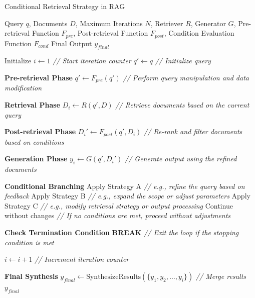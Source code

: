 \begin{algorithm}
	\caption{Conditional Retrieval Strategy in RAG}
	\label{alg:conditional_rag_workflow}
	\begin{algorithmic}[1]
		\REQUIRE Query $q$, Documents $D$, Maximum Iterations $N$, Retriever $R$, Generator $G$, Pre-retrieval Function $F_{pre}$, Post-retrieval Function $F_{post}$, Condition Evaluation Function $F_{cond}$
		\ENSURE Final Output $y_{final}$
		
		\STATE Initialize $i \gets 1$ \hfill \textit{// Start iteration counter}
		\STATE $q' \gets q$ \hfill \textit{// Initialize query}
		
		
		\STATE \textbf{Pre-retrieval Phase}
		\STATE $q' \gets F_{pre}(q')$ \hfill \textit{// Perform query manipulation and data modification}
		
		\STATE \textbf{Retrieval Phase}
		\STATE $D_{i} \gets R(q', D)$ \hfill \textit{// Retrieve documents based on the current query}
		
		\STATE \textbf{Post-retrieval Phase}
		\STATE $D_{i}' \gets F_{post}(q', D_{i})$ \hfill \textit{// Re-rank and filter documents based on conditions}
		
		\STATE \textbf{Generation Phase}
		\STATE $y_{i} \gets G(q', D_{i}')$ \hfill \textit{// Generate output using the refined documents}
		
		\STATE \textbf{Conditional Branching}
		\STATE Apply Strategy A \hfill \textit{// e.g., refine the query based on feedback}
		\STATE Apply Strategy B \hfill \textit{// e.g., expand the scope or adjust parameters}
		\STATE Apply Strategy C \hfill \textit{// e.g., modify retrieval strategy or output processing}
		\ELSE
		\STATE Continue without changes \hfill \textit{// If no conditions are met, proceed without adjustments}
		\ENDIF
		
		\STATE \textbf{Check Termination Condition}
		\STATE \textbf{BREAK} \hfill \textit{// Exit the loop if the stopping condition is met}
		\ENDIF
		
		\STATE $i \gets i + 1$ \hfill \textit{// Increment iteration counter}
		\ENDWHILE
		
		\STATE \textbf{Final Synthesis}
		\STATE $y_{final} \gets \text{SynthesizeResults}(\{y_{1}, y_{2}, \dots, y_{i}\})$ \hfill \textit{// Merge results}
		\RETURN $y_{final}$
		
	\end{algorithmic}
\end{algorithm}

